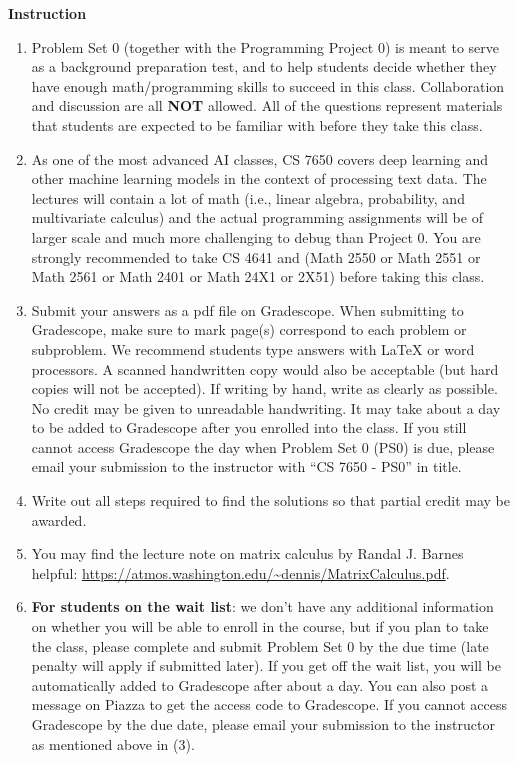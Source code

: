 \documentclass[11pt, letterpaper]{article}
\begin{document}
{\Large \textbf{Instruction}}
\begin{enumerate}
    \item Problem Set 0 (together with the Programming Project 0) is meant to serve as a background preparation test, and to help students decide whether they have enough math/programming skills to succeed in this class. Collaboration and discussion are all \textbf{NOT} allowed. All of the questions represent materials that students are expected to be familiar with before they take this class. 
    
    \item As one of the most advanced AI classes, CS 7650 covers deep learning and other machine learning models in the context of processing text data. The lectures will contain a lot of math (i.e., linear algebra, probability, and multivariate calculus) and the actual programming assignments will be of larger scale and much more challenging to debug than Project 0. You are strongly recommended to take CS 4641 and (Math 2550 or Math 2551 or Math 2561 or Math 2401 or Math 24X1 or 2X51) before taking this class. 
   
    \item Submit your answers as a pdf file on Gradescope. When submitting to Gradescope, make sure to mark page(s) correspond to each problem or subproblem. We recommend students type answers with LaTeX or word processors. A scanned handwritten copy would also be acceptable (but hard copies will not be accepted). If writing by hand, write as clearly as possible. No credit may be given to unreadable handwriting. It may take about a day to be added to Gradescope after you enrolled into the class. If you still cannot access Gradescope the day when Problem Set 0 (PS0) is due, please email your submission to the instructor with ``CS 7650 - PS0'' in title. 
    
    \item Write out all steps required to find the solutions so that partial credit may be awarded.
    
    \item You may find the lecture note on matrix calculus by Randal J. Barnes helpful: \url{https://atmos.washington.edu/~dennis/MatrixCalculus.pdf}. 
    
    \item \textbf{For students on the wait list}: we don't have any additional information on whether you will be able to enroll in the course, but if you plan to take the class, please complete and submit Problem Set 0 by the due time (late penalty will apply if submitted later). If you get off the wait list, you will be automatically added to Gradescope after about a day. You can also post a message on Piazza to get the access code to Gradescope. If you cannot access Gradescope by the due date, please email your submission to the instructor as mentioned above in (3).
\end{enumerate}
\end{document}
